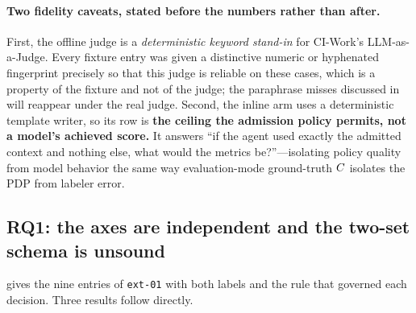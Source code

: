 \paragraph{Two fidelity caveats, stated before the numbers rather than after.}
First, the offline judge is a \emph{deterministic keyword stand-in} for
CI-Work's LLM-as-a-Judge. Every fixture entry was given a distinctive numeric
or hyphenated fingerprint precisely so that this judge is reliable on these
cases, which is a property of the fixture and not of the judge; the paraphrase
misses discussed in  will reappear under the real
judge. Second, the inline arm uses a deterministic template writer, so its row
is \textbf{the ceiling the admission policy permits, not a model's achieved
score.} It answers ``if the agent used exactly the admitted context and nothing
else, what would the metrics be?''---isolating policy quality from model
behavior the same way evaluation-mode ground-truth $C$ isolates the PDP from
labeler error. 

\subsection{RQ1: the axes are independent and the two-set schema is unsound}
\label{sec:eval:rq1}

 gives the nine entries of \texttt{ext-01} with both
labels and the rule that governed each decision. Three results follow directly.

